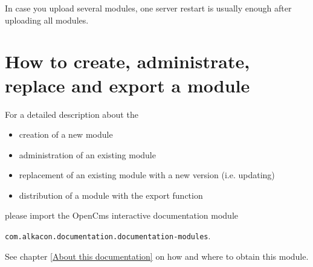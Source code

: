 In case you upload several modules, one server restart is usually enough after uploading all modules.

\section{How to create, administrate, replace and export a module}

For a detailed description about the

\begin{itemize}

\item creation of a new module

\item administration of an existing module

\item replacement of an existing module with a new version (i.e. updating)

\item distribution of a module with the export function 

\end{itemize}

please import the OpenCms interactive documentation module

{\tt com.alkacon.documentation.documentation-modules}.

See chapter \ref{About this documentation} on how and where to obtain this module.